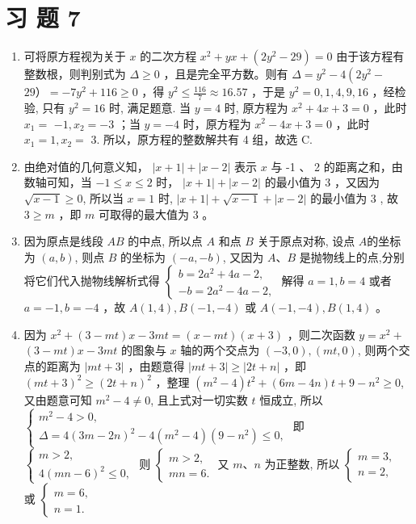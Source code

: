 \documentclass[10pt]{article}
\begin{document}
\section*{习 题 7}
\begin{enumerate}
  \item 可将原方程视为关于 $x$ 的二次方程 $x^{2}+y x+\left(2 y^{2}-29\right)=0$ 由于该方程有整数根，则判别式为 $\Delta \geqslant 0$ ，且是完全平方数。则有 $\Delta=y^{2}-4\left(2 y^{2}-\right.$ $29）=-7 y^{2}+116 \geqslant 0$ ，得 $y^{2} \leqslant \frac{116}{7} \approx 16.57$ ，于是 $y^{2}=0,1,4,9,16$ ，经检验, 只有 $y^{2}=16$ 时, 满足题意. 当 $y=4$ 时, 原方程为 $x^{2}+4 x+3=0$ ，此时 $x_{1}=$ $-1, x_{2}=-3$ ；当 $y=-4$ 时，原方程为 $x^{2}-4 x+3=0$ ，此时 $x_{1}=1, x_{2}=$ 3. 所以，原方程的整数解共有 4 组，故选 C.
  \item 由绝对值的几何意义知， $|x+1|+|x-2|$ 表示 $x$ 与 -1 、 2 的距离之和，由数轴可知，当 $-1 \leqslant x \leqslant 2$ 时， $|x+1|+|x-2|$ 的最小值为 3 ，又因为 $\sqrt{x-1} \geqslant 0$, 所以当 $x=1$ 时, $|x+1|+\sqrt{x-1}+|x-2|$ 的最小值为 3 , 故 $3 \geqslant m$ ，即 $m$ 可取得的最大值为 3 。
  \item 因为原点是线段 $A B$ 的中点, 所以点 $A$ 和点 $B$ 关于原点对称, 设点 $A$的坐标为 $(a, b)$, 则点 $B$ 的坐标为 $(-a,-b)$, 又因为 $A 、 B$ 是抛物线上的点,分别将它们代入抛物线解析式得 $\left\{\begin{array}{l}b=2 a^{2}+4 a-2, \\ -b=2 a^{2}-4 a-2,\end{array}\right.$ 解得 $a=1, b=4$ 或者 $a=-1, b=-4$ ，故 $A(1,4), B(-1,-4)$ 或 $A(-1,-4), B(1,4)$ 。
  \item 因为 $x^{2}+(3-m t) x-3 m t=(x-m t)(x+3)$ ，则二次函数 $y=x^{2}+$ $(3-m t) x-3 m t$ 的图象与 $x$ 轴的两个交点为 $(-3,0),(m t, 0)$, 则两个交点的距离为 $|m t+3|$ ，由题意得 $|m t+3| \geqslant|2 t+n|$ ，即 $(m t+3)^{2} \geqslant(2 t+n)^{2}$ ，整理 $\left(m^{2}-4\right) t^{2}+(6 m-4 n) t+9-n^{2} \geqslant 0$, 又由题意可知 $m^{2}-4 \neq 0$, 且上式对一切实数 $t$ 恒成立, 所以 $\left\{\begin{array}{l}m^{2}-4>0, \\ \Delta=4(3 m-2 n)^{2}-4\left(m^{2}-4\right)\left(9-n^{2}\right) \leqslant 0,\end{array}\right.$ 即 $\left\{\begin{array}{l}m>2, \\ 4(m n-6)^{2} \leqslant 0,\end{array}\right.$ 则 $\left\{\begin{array}{l}m>2, \\ m n=6 .\end{array}\right.$ 又 $m 、 n$ 为正整数, 所以 $\left\{\begin{array}{l}m=3, \\ n=2,\end{array}\right.$ 或 $\left\{\begin{array}{l}m=6, \\ n=1 .\end{array}\right.$

\end{enumerate}
\end{document}

